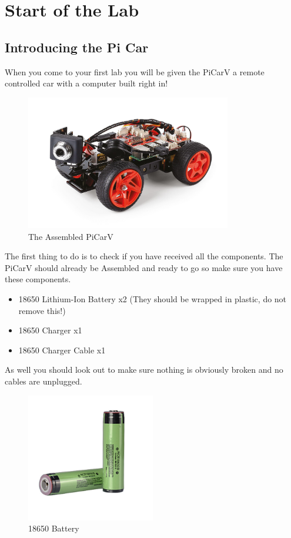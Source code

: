 \documentclass[11pt]{report}
\begin{document}
    \chapter{Start of the Lab}

    \section{Introducing the Pi Car}
    When you come to your first lab you will be given the PiCarV a remote controlled car with a computer built right in! 

    \begin{figure}[h]
        \centering
        \includegraphics[width=0.8\textwidth]{picarv.jpg}
        \caption{The Assembled PiCarV}
        \label{fig:The Assembled PiCarV}
    \end{figure}

    The first thing to do is to check if you have received all the components. The PiCarV should already be Assembled and ready to go so make sure you have these components.

    \begin{itemize}
        \item 18650 Lithium-Ion Battery x2 (They should be wrapped in plastic, do not remove this!)
        \item 18650 Charger x1
        \item 18650 Charger Cable x1
    \end{itemize}

    As well you should look out to make sure nothing is obviously broken and no cables are unplugged.

\begin {figure}[h]
    \centering
    \includegraphics[width=0.5\textwidth]{battery.jpg}
    \caption{18650 Battery}
    \label{fig: 18650 Battery}
\end{figure}
    
\end{document}
